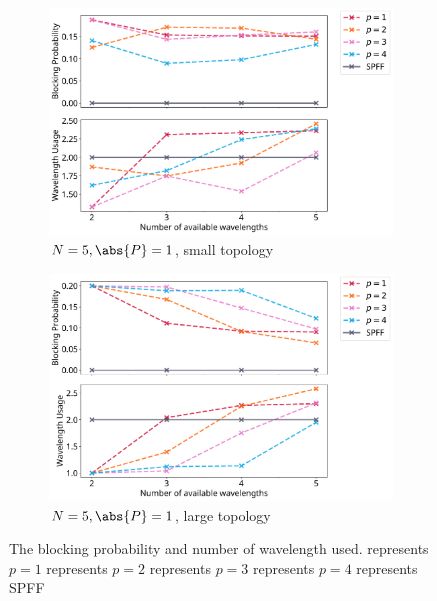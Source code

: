 \begin{figure}[H]
	\centering
	\begin{subfigure}{0.49\textwidth}
	\includegraphics[width=\textwidth]{pictures/plots/n_wavelength/5-1-x-s.pdf}
	\caption{$N=5, \abs{P} = 1$, small topology}
	\end{subfigure}
	\begin{subfigure}{0.49\textwidth}
	\includegraphics[width=\textwidth]{pictures/plots/n_wavelength/5-1-x-m.pdf}
	\caption{$N=5, \abs{P} = 1$, large topology}
	\end{subfigure}
\caption{The blocking probability and number of wavelength used.
\protect\reddashed represents $p=1$
\protect\peachdashed represents $p=2$
\protect\pinkdashed represents $p=3$
\protect\skydashed represents $p=4$
\protect\blackline represents SPFF
}
\label{fig:wavelengths}
\end{figure}
